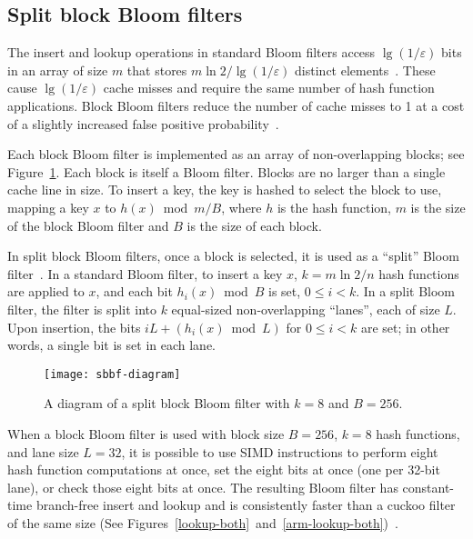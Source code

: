 \documentclass[letterpaper,twocolumn,10pt]{article}
\newcommand{\etal}{et al.}
\begin{document}
\subsection{Split block Bloom filters}



The insert and lookup operations in standard Bloom filters access $\lg (1/\varepsilon)$ bits in an array of size $m$ that stores $m \ln 2 / \lg(1/\varepsilon)$ distinct elements~\cite{bloom-original}.
These cause $\lg (1/\varepsilon)$ cache misses and require the same number of hash function applications.
Block Bloom filters reduce the number of cache misses to 1 at a cost of a slightly increased false positive probability~\cite{block-bloom}.

Each block Bloom filter is implemented as an array of non-overlapping blocks; see Figure~\ref{sbbf-diagram}.
Each block is itself a Bloom filter.
Blocks are no larger than a single cache line in size.
To insert a key, the key is hashed to select the block to use, mapping a key $x$ to $h(x) \bmod m/B$, where $h$ is the hash function, $m$ is the size of the block Bloom filter and $B$ is the size of each block.

In split block Bloom filters, once a block is selected, it is used as a ``split'' Bloom filter~\cite{split-bloom}.
In a standard Bloom filter, to insert a key $x$, $k = m \ln 2 / n$ hash functions are applied to $x$, and each bit $h_i(x) \bmod B$ is set, $0 \le i < k$.
In a split Bloom filter, the filter is split into $k$ equal-sized non-overlapping ``lanes'', each of size $L$.
Upon insertion, the bits $i L + (h_i(x) \bmod L)$ for $0 \le i < k$ are set; in other words, a single bit is set in each lane.

\begin{figure}[b!]
  \texttt{[image: sbbf-diagram]}
\caption{\label{sbbf-diagram}
A diagram of a split block Bloom filter with $k = 8$ and $B = 256$.
}
\end{figure}

When a block Bloom filter is used with block size $B = 256$, $k = 8$ hash functions, and lane size $L = 32$, it is possible to use SIMD instructions to perform eight hash function computations at once, set the eight bits at once (one per 32-bit lane), or check those eight bits at once.
The resulting Bloom filter has constant-time branch-free insert and lookup and is consistently faster than a cuckoo filter of the same size (See Figures~\ref{lookup-both}~and~\ref{arm-lookup-both})~\cite{cuckoo-filter-github,ultra-fast,overtakes,impala-bloom}.
\end{document}
